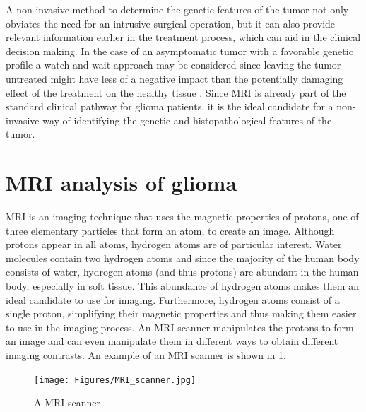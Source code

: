 A non-invasive method to determine the genetic features of the \gls{tumor} not only obviates the need for an intrusive surgical operation, but it can also provide relevant information earlier in the treatment process, which can aid in the clinical decision making.
In the case of an asymptomatic \gls{tumor} with a favorable genetic profile a watch-and-wait approach may be considered since leaving the \gls{tumor} untreated might have less of a negative impact than the potentially damaging effect of the treatment on the healthy tissue \autocite{vandenbent2012lggtreatment, welle2017EANO}.
Since \acrlong{MRI} is already part of the standard clinical pathway for glioma patients, it is the ideal candidate for a non-invasive way of identifying the genetic and histopathological features of the \gls{tumor}.

\section{MRI analysis of glioma}

\Acrfull{MRI} is an imaging technique that uses the magnetic properties of protons, one of three elementary particles that form an atom, to create an image.
Although protons appear in all atoms, hydrogen atoms are of particular interest.
Water molecules contain two hydrogen atoms and since the majority of the human body consists of water, hydrogen atoms (and thus protons) are abundant in the human body, especially in soft tissue.
This abundance of hydrogen atoms makes them an ideal candidate to use for imaging.
Furthermore, hydrogen atoms consist of a single proton, simplifying their magnetic properties and thus making them easier to use in the imaging process.
An \gls{MRI} scanner manipulates the protons to form an image and can even manipulate them in different ways to obtain different imaging contrasts.
An example of an \gls{MRI} scanner is shown in \cref{fig:intro_MR_machine}.


\begin{figure}[hbt]
    \centering
    \texttt{[image: Figures/MRI\_scanner.jpg]}
    \caption{A \acrfull{MRI} scanner}\label{fig:intro_MR_machine}
\end{figure}

